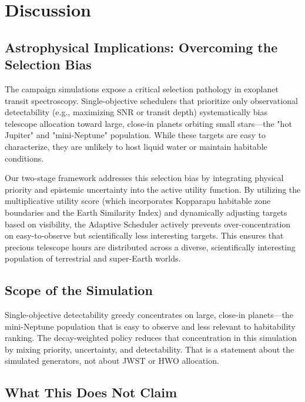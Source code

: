 \documentclass[11pt,a4paper]{article}
\begin{document}
\section{Discussion}
\label{sec:discussion}

\subsection{Astrophysical Implications: Overcoming the Selection Bias}

The campaign simulations expose a critical selection pathology in exoplanet transit spectroscopy. Single-objective schedulers that prioritize only observational detectability (e.g., maximizing SNR or transit depth) systematically bias telescope allocation toward large, close-in planets orbiting small stars—the "hot Jupiter" and "mini-Neptune" population. While these targets are easy to characterize, they are unlikely to host liquid water or maintain habitable conditions.

Our two-stage framework addresses this selection bias by integrating physical priority and epistemic uncertainty into the active utility function. By utilizing the multiplicative utility score (which incorporates Kopparapu habitable zone boundaries and the Earth Similarity Index) and dynamically adjusting targets based on visibility, the Adaptive Scheduler actively prevents over-concentration on easy-to-observe but scientifically less interesting targets. This ensures that precious telescope hours are distributed across a diverse, scientifically interesting population of terrestrial and super-Earth worlds.

\subsection{Scope of the Simulation}

Single-objective detectability greedy concentrates on large, close-in planets---the mini-Neptune population that is easy to observe and less relevant to habitability ranking. The decay-weighted policy reduces that concentration in this simulation by mixing priority, uncertainty, and detectability. That is a statement about the simulated generators, not about JWST or HWO allocation.

\subsection{What This Does Not Claim}
\end{document}
